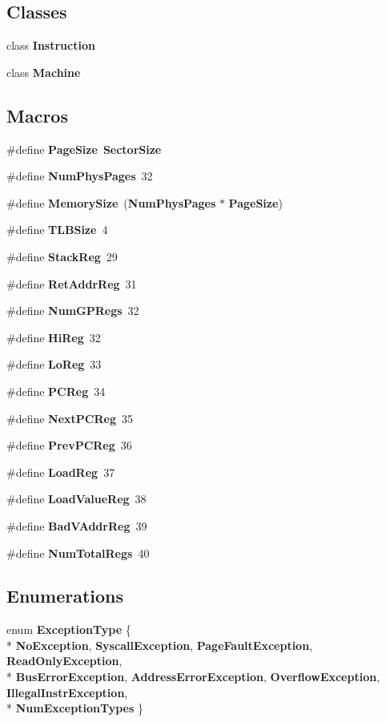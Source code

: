 \subsection*{Classes}
\begin{DoxyCompactItemize}
\item 
class {\bf Instruction}
\item 
class {\bf Machine}
\end{DoxyCompactItemize}
\subsection*{Macros}
\begin{DoxyCompactItemize}
\item 
\#define {\bf Page\+Size}~{\bf Sector\+Size}
\item 
\#define {\bf Num\+Phys\+Pages}~32
\item 
\#define {\bf Memory\+Size}~({\bf Num\+Phys\+Pages} $\ast$ {\bf Page\+Size})
\item 
\#define {\bf T\+L\+B\+Size}~4
\item 
\#define {\bf Stack\+Reg}~29
\item 
\#define {\bf Ret\+Addr\+Reg}~31
\item 
\#define {\bf Num\+G\+P\+Regs}~32
\item 
\#define {\bf Hi\+Reg}~32
\item 
\#define {\bf Lo\+Reg}~33
\item 
\#define {\bf P\+C\+Reg}~34
\item 
\#define {\bf Next\+P\+C\+Reg}~35
\item 
\#define {\bf Prev\+P\+C\+Reg}~36
\item 
\#define {\bf Load\+Reg}~37
\item 
\#define {\bf Load\+Value\+Reg}~38
\item 
\#define {\bf Bad\+V\+Addr\+Reg}~39
\item 
\#define {\bf Num\+Total\+Regs}~40
\end{DoxyCompactItemize}
\subsection*{Enumerations}
\begin{DoxyCompactItemize}
\item 
enum {\bf Exception\+Type} \{ \\*
{\bf No\+Exception}, 
{\bf Syscall\+Exception}, 
{\bf Page\+Fault\+Exception}, 
{\bf Read\+Only\+Exception}, 
\\*
{\bf Bus\+Error\+Exception}, 
{\bf Address\+Error\+Exception}, 
{\bf Overflow\+Exception}, 
{\bf Illegal\+Instr\+Exception}, 
\\*
{\bf Num\+Exception\+Types}
 \}
\end{DoxyCompactItemize}
